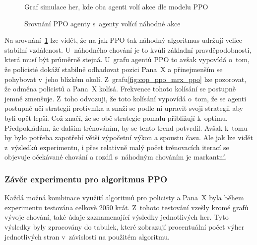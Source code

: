 \begin{figure}[H]
\begin{minipage}{.48\textwidth}
      \caption{Graf simulace her, kde oba agenti volí akce dle modelu PPO}
      \label{fig:cop_ppo_mrx_ppo}
  \end{minipage}
  \caption{Srovnání PPO agenty s~agenty volící náhodné akce}
  \label{fig:srovnani_random_ppo}
  \end{figure}

Na srovnání~\ref{fig:srovnani_random_ppo} lze vidět, že na jak PPO tak náhodný algoritmus udržují velice stabilní vzdálenost.
U~náhodného chování je to kvůli základní pravděpodobnosti, která musí být průměrně stejná.
U~grafu agentů PPO to avšak vypovídá o~tom, že policisté dokáží stabilně odhadovat pozici Pana~X a přinejmenším se pohybovat v~jeho blízkém okolí.
Z~grafu\ref{fig:cop_ppo_mrx_ppo} lze pozorovat, že odměna policistů a Pana~X kolísá.
Frekvence tohoto kolísání se postupně jemně zmenšuje.
Z~toho odvozuji, že toto kolísání vypovídá o~tom, že se agenti postupně učí strategii protivníka a snaží se podle ní upravit svoji strategii aby byli opět lepší.
Což značí, že se obě strategie pomalu přibližují k~optimu.
Předpokládám, že dalším trénováním, by se tento trend potvrdil.
Avšak k~tomu by bylo potřeba zapotřebí větší výpočetní výkon a spoustu času.
Ale jak lze vidět z~výsledků experimentu, i přes relativně malý počet trénovacích iterací se objevuje očekávané chování a rozdíl s~náhodným chováním je markantní.

\subsubsection*{Závěr experimentu pro algoritmus PPO}

Každá možná kombinace využití algoritmů pro policisty a Pana~X byla během experimentu testována celkově 2050 krát.
Z~tohoto testování vzešly kromě grafů vývoje chování, také údaje zaznamenající výsledky jednotlivých her.
Tyto výsledky byly zpracovány do tabulek, které zobrazují procentuální počet výher jednotlivých stran v~závislosti na použitém algoritmu.

